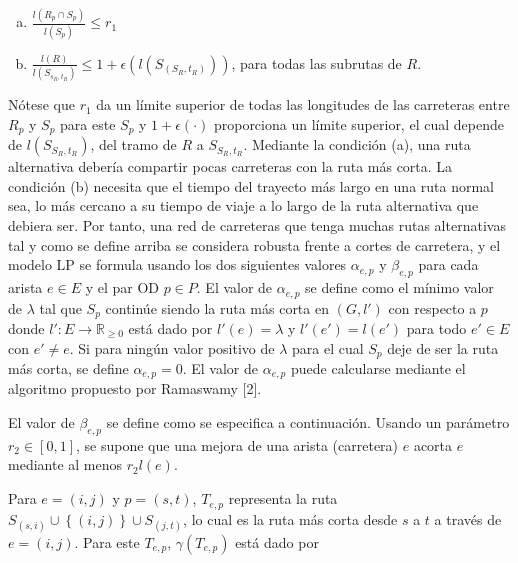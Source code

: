 \documentclass[10pt]{report}
\begin{document}
\begin{enumerate}[(a)]
	\item $\frac{l\left(R_{p} \cap S_{p}\right)}{l \left(S_{p}\right)} \leq r_{1}$ 
	\item $\frac{l\left(R\right)}
	            {l\left(S_{s_{R},t_{R}}\right)} \leq 1 + \epsilon \left( l \left( S_{\left( S_{R},t_{R}\right)} \right)  \right)$, para todas las subrutas de $R$.
\end{enumerate}

Nótese que $r_{1}$ da un límite superior de todas las longitudes de las carreteras entre $R_{p}$ y $S_{p}$ para este $S_{p}$ y $1+\epsilon \left( \cdot \right) $ proporciona un límite superior, el cual depende de $l(S_{S_{R},t_{R}})$,  del tramo de $R$ a $S_{S_{R},t_{R}}$. Mediante la condición (a), una ruta alternativa debería compartir pocas carreteras con la ruta más corta. La condición (b) necesita que el tiempo del trayecto más largo en una ruta normal sea, lo más cercano a su tiempo de viaje a lo largo de la ruta alternativa que debiera ser.
Por tanto, una red de carreteras que tenga muchas rutas alternativas tal y como se define arriba se considera robusta frente a cortes de carretera, y el modelo LP se formula usando los dos siguientes valores $\alpha_{e,p}$ y   $\beta_{e,p}$ para cada arista $e \in E$ y el par OD $p \in P$. El valor de $\alpha_{e,p}$ se define como el mínimo valor de $\lambda$ tal que $S_{p}$ continúe siendo la ruta más corta en $\left( G, l'\right)$ con respecto a $p$ donde $l': E \longrightarrow \mathbb{R}_{\geq 0} $ está dado por $l'\left( e\right) = \lambda$ y $l'\left( e'\right) =  l\left( e'\right)$ para todo $e' \in E$ con $e'\neq e$. %
Si para ningún valor positivo de $\lambda$ para el cual $S_p$ deje de ser la ruta más corta, se define $\alpha_{e,p}=0$. El valor de $\alpha_{e,p}$ puede calcularse mediante el algoritmo propuesto por Ramaswamy [2].

El valor de $\beta_{e,p}$ se define como se especifica a continuación. Usando un parámetro $r_{2} \in \left[ 0,1 \right]$, se supone que una mejora de una arista (carretera) $e$ acorta $e$ mediante al menos $r_{2}l\left( e\right)$.

Para $e = \left( i , j\right)$ y $p = \left( s , t\right)$, $T_{e,p}$ representa la ruta $S_{\left(s, i\right)} \cup \left\{ \left(i,j \right) \right\}\cup S_{\left(j, t\right)} $, lo cual es la ruta más corta desde $s$ a $t$ a través de $e = \left(i,j \right)$. Para este $T_{e,p}$, $\gamma\left(T_{e,p}\right)$  está dado por
\end{document}
